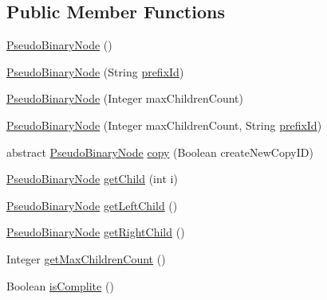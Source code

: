 \subsection*{Public Member Functions}
\begin{DoxyCompactItemize}
\item 
\hyperlink{classit_1_1emarolab_1_1cagg_1_1core_1_1PseudoBinaryNode_a48a6abb7a91260ab27840f8c6af3b60f}{Pseudo\-Binary\-Node} ()
\item 
\hyperlink{classit_1_1emarolab_1_1cagg_1_1core_1_1PseudoBinaryNode_a2332773589394e6ee1570aad19a5784e}{Pseudo\-Binary\-Node} (String \hyperlink{classit_1_1emarolab_1_1cagg_1_1core_1_1BaseNode_a1e4662066a1e580f3ef9a1ad7c483dd8}{prefix\-Id})
\item 
\hyperlink{classit_1_1emarolab_1_1cagg_1_1core_1_1PseudoBinaryNode_a7f9b37956337cb69a193e5de2b9199c6}{Pseudo\-Binary\-Node} (Integer max\-Children\-Count)
\item 
\hyperlink{classit_1_1emarolab_1_1cagg_1_1core_1_1PseudoBinaryNode_a9bca2a3dc231b68c82a412fb56aef62c}{Pseudo\-Binary\-Node} (Integer max\-Children\-Count, String \hyperlink{classit_1_1emarolab_1_1cagg_1_1core_1_1BaseNode_a1e4662066a1e580f3ef9a1ad7c483dd8}{prefix\-Id})
\item 
abstract \hyperlink{classit_1_1emarolab_1_1cagg_1_1core_1_1PseudoBinaryNode}{Pseudo\-Binary\-Node} \hyperlink{classit_1_1emarolab_1_1cagg_1_1core_1_1PseudoBinaryNode_ae5154ac401eb930685c68c48facfb32b}{copy} (Boolean create\-New\-Copy\-I\-D)
\item 
\hyperlink{classit_1_1emarolab_1_1cagg_1_1core_1_1PseudoBinaryNode}{Pseudo\-Binary\-Node} \hyperlink{classit_1_1emarolab_1_1cagg_1_1core_1_1PseudoBinaryNode_ac3bd0f419f12d9bf9fd6ffe900f1a0a4}{get\-Child} (int i)
\item 
\hyperlink{classit_1_1emarolab_1_1cagg_1_1core_1_1PseudoBinaryNode}{Pseudo\-Binary\-Node} \hyperlink{classit_1_1emarolab_1_1cagg_1_1core_1_1PseudoBinaryNode_a94bf59c3174076cdbf081502f178a9de}{get\-Left\-Child} ()
\item 
\hyperlink{classit_1_1emarolab_1_1cagg_1_1core_1_1PseudoBinaryNode}{Pseudo\-Binary\-Node} \hyperlink{classit_1_1emarolab_1_1cagg_1_1core_1_1PseudoBinaryNode_a33d544e6cd90d47a75fdc7168f6b310e}{get\-Right\-Child} ()
\item 
Integer \hyperlink{classit_1_1emarolab_1_1cagg_1_1core_1_1PseudoBinaryNode_a9dfa5947569637aadc37d36ef0b857a2}{get\-Max\-Children\-Count} ()
\item 
Boolean \hyperlink{classit_1_1emarolab_1_1cagg_1_1core_1_1PseudoBinaryNode_a8fd7c53c0d09b288c8de47ee519a2977}{is\-Complite} ()

\end{DoxyCompactItemize}
